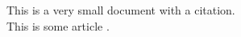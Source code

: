 \documentclass{article}
\begin{document}
This is a very small document with a citation.\\[2mm]
This is some article \citep{einstein}.



\end{document}
